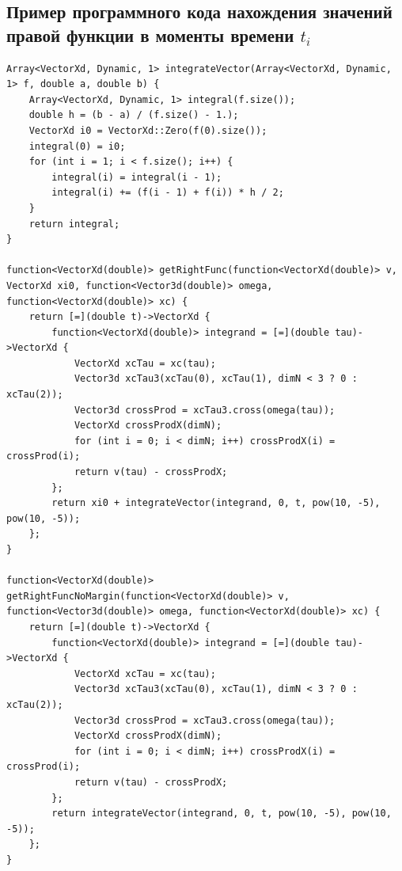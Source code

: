 \documentclass[12pt,a4paper]{article}
\begin{document}
\subsection{Пример программного кода нахождения значений правой функции в моменты времени $t_i$}
\label{code:rf}
\begin{lstlisting}
Array<VectorXd, Dynamic, 1> integrateVector(Array<VectorXd, Dynamic, 1> f, double a, double b) {
    Array<VectorXd, Dynamic, 1> integral(f.size());
    double h = (b - a) / (f.size() - 1.);
    VectorXd i0 = VectorXd::Zero(f(0).size());
    integral(0) = i0;
    for (int i = 1; i < f.size(); i++) {
        integral(i) = integral(i - 1);
        integral(i) += (f(i - 1) + f(i)) * h / 2;
    }
    return integral;
}

function<VectorXd(double)> getRightFunc(function<VectorXd(double)> v, VectorXd xi0, function<Vector3d(double)> omega, function<VectorXd(double)> xc) {
    return [=](double t)->VectorXd {
        function<VectorXd(double)> integrand = [=](double tau)->VectorXd {
            VectorXd xcTau = xc(tau);
            Vector3d xcTau3(xcTau(0), xcTau(1), dimN < 3 ? 0 : xcTau(2));
            Vector3d crossProd = xcTau3.cross(omega(tau));
            VectorXd crossProdX(dimN);
            for (int i = 0; i < dimN; i++) crossProdX(i) = crossProd(i);
            return v(tau) - crossProdX;
        };
        return xi0 + integrateVector(integrand, 0, t, pow(10, -5), pow(10, -5));
    };
}

function<VectorXd(double)> getRightFuncNoMargin(function<VectorXd(double)> v, function<Vector3d(double)> omega, function<VectorXd(double)> xc) {
    return [=](double t)->VectorXd {
        function<VectorXd(double)> integrand = [=](double tau)->VectorXd {
            VectorXd xcTau = xc(tau);
            Vector3d xcTau3(xcTau(0), xcTau(1), dimN < 3 ? 0 : xcTau(2));
            Vector3d crossProd = xcTau3.cross(omega(tau));
            VectorXd crossProdX(dimN);
            for (int i = 0; i < dimN; i++) crossProdX(i) = crossProd(i);
            return v(tau) - crossProdX;
        };
        return integrateVector(integrand, 0, t, pow(10, -5), pow(10, -5));
    };
}
\end{lstlisting}
\end{document}
